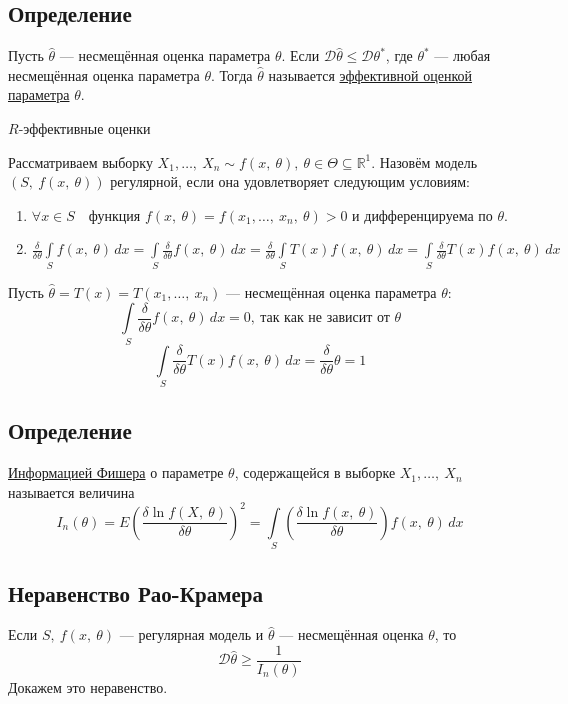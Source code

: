 \documentclass[12pt, a4paper]{article}
\newcommand{\dev}{\mathcal{D}}
\begin{document}
\subsection*{Определение}
Пусть $\hat{\theta}$ --- несмещённая оценка параметра $\theta$. Если $\dev\hat{\theta} \leq \dev \theta^*$, где $\theta^*$ --- любая несмещённая оценка параметра $\theta$. Тогда $\hat{\theta}$ называется \underline{эффективной оценкой параметра} $\theta$.
\begin{center}
    $R$-эффективные оценки
\end{center}
Рассматриваем выборку $X_1,\dots,\ X_n \sim f(x,\ \theta),\ \theta\in \Theta \subseteq \mathbb{R}^1$. Назовём модель $(S,\ f(x,\ \theta))$ регулярной, если она удовлетворяет следующим условиям:
\begin{enumerate}
    \item $\forall x\in S\quad \text{функция } f(x,\ \theta) = f(x_1,\dots,\ x_n,\ \theta) > 0$ и дифференцируема по $\theta$.
    \item $\displaystyle\frac{\delta}{\delta \theta} \int\limits_S f(x,\ \theta)\, dx = \int\limits_S \frac{\delta}{\delta \theta} f(x,\ \theta)\, dx = \frac{\delta}{\delta \theta} \int\limits_S T(x)f(x,\ \theta)\, dx = \int\limits_S \frac{\delta}{\delta \theta} T(x) f(x,\ \theta)\, dx$
\end{enumerate}
Пусть $\hat{\theta} = T(x) = T(x_1,\dots,\ x_n)$ --- несмещённая оценка параметра $\theta$:
\[\int\limits_S \frac{\delta}{\delta \theta} f(x,\ \theta)\, dx = 0,\ \text{так как не зависит от $\theta$}\]
\[\int\limits_S \frac{\delta}{\delta \theta} T(x) f(x,\ \theta)\, dx = \frac{\delta}{\delta \theta}\theta = 1\]
\subsection*{Определение}
\underline{Информацией Фишера} о параметре $\theta$, содержащейся в выборке $X_1,\dots,\ X_n$ называется величина
\[I_n(\theta) = E\left( \frac{\delta \ln f(X,\ \theta)}{\delta \theta} \right)^2 = \int\limits_S\left( \frac{\delta \ln f(x,\ \theta)}{\delta \theta} \right) f(x,\ \theta)\, dx\]
\subsection*{Неравенство Рао-Крамера}
Если $S,\ f(x,\ \theta)$ --- регулярная модель и $\hat{\theta}$ --- несмещённая оценка $\theta$, то 
\[\dev \hat{\theta} \geq \frac{1}{I_n(\theta)}\]
Докажем это неравенство.
\end{document}
